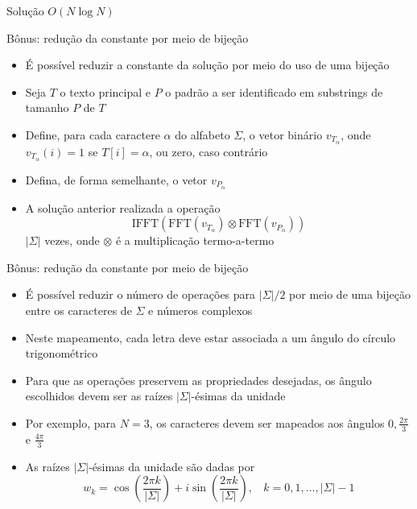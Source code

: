 \begin{frame}[fragile]{Solução $O(N\log N)$}
\end{frame}

\begin{frame}[fragile]{Bônus: redução da constante por meio de bijeção}
    \begin{itemize}
        \item É possível reduzir a constante da solução por meio do uso de uma bijeção

        \item Seja $T$ o texto principal e $P$ o padrão a ser identificado em substrings de tamanho $P$ de $T$

        \item Define, para cada caractere $\alpha$ do alfabeto $\Sigma$, o vetor binário $v_{T_\alpha}$, onde
            $v_{T_\alpha}(i) = 1$ se $T[i] = \alpha$, ou zero, caso contrário

        \item Defina, de forma semelhante, o vetor $v_{P_\alpha}$

        \item A solução anterior realizada a operação
        \[
            \mathrm{IFFT}(\mathrm{FFT}(v_{T_\alpha})\otimes\mathrm{FFT}(v_{P_\alpha}))
        \]
        $|\Sigma|$ vezes, onde $\otimes$ é a multiplicação termo-a-termo

    \end{itemize}

\end{frame}

\begin{frame}[fragile]{Bônus: redução da constante por meio de bijeção}

    \begin{itemize}
        \item É possível reduzir o número de operações para $|\Sigma|/2$ por meio de uma bijeção entre os caracteres de $\Sigma$ e números complexos

        \item Neste mapeamento, cada letra deve estar associada a um ângulo do círculo trigonométrico

        \item Para que as operações preservem as propriedades desejadas, os ângulo escolhidos devem ser as raízes $|\Sigma|$-ésimas da unidade

        \item Por exemplo, para $N = 3$, os caracteres devem ser mapeados aos ângulos $0, \frac{2\pi}{3}$ e $\frac{4\pi}{3}$

        \item As raízes $|\Sigma|$-ésimas da unidade são dadas por
        \[
            w_k = \cos\left(\frac{2\pi k}{|\Sigma|}\right) + i\sin\left(\frac{2\pi k}{|\Sigma|}\right), \ \ \ \ k = 0, 1, \ldots, |\Sigma| - 1
        \]

    \end{itemize}

\end{frame}

